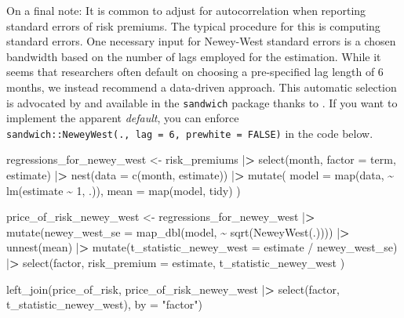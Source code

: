 \documentclass[
]{book}
\newenvironment{Shaded}{\begin{snugshade}}{\end{snugshade}}
\newcommand{\AttributeTok}[1]{\textcolor[rgb]{0.61,0.61,0.61}{#1}}
\newcommand{\DecValTok}[1]{\textcolor[rgb]{0.06,0.06,0.06}{#1}}
\newcommand{\ErrorTok}[1]{\textcolor[rgb]{0.14,0.14,0.14}{\textbf{#1}}}
\newcommand{\FunctionTok}[1]{\textcolor[rgb]{0,0,0}{#1}}
\newcommand{\NormalTok}[1]{#1}
\newcommand{\OtherTok}[1]{\textcolor[rgb]{0.37,0.37,0.37}{#1}}
\newcommand{\SpecialCharTok}[1]{\textcolor[rgb]{0,0,0}{#1}}
\newcommand{\StringTok}[1]{\textcolor[rgb]{0.5,0.5,0.5}{#1}}
\begin{document}
On a final note: It is common to adjust for autocorrelation when reporting standard errors of risk premiums. The typical procedure for this is computing \citet{Newey1987} standard errors. One necessary input for Newey-West standard errors is a chosen bandwidth based on the number of lags employed for the estimation. While it seems that researchers often default on choosing a pre-specified lag length of 6 months, we instead recommend a data-driven approach. This automatic selection is advocated by \citet{Newey1994} and available in the \texttt{sandwich} package thanks to \citet{Zeileis2004}. If you want to implement the apparent \emph{default}, you can enforce \texttt{sandwich::NeweyWest(.,\ lag\ =\ 6,\ prewhite\ =\ FALSE)} in the code below.

\begin{Shaded}
\begin{Highlighting}[]
\NormalTok{regressions\_for\_newey\_west }\OtherTok{\textless{}{-}}\NormalTok{ risk\_premiums }\SpecialCharTok{|}\ErrorTok{\textgreater{}}
  \FunctionTok{select}\NormalTok{(month, }\AttributeTok{factor =}\NormalTok{ term, estimate) }\SpecialCharTok{|}\ErrorTok{\textgreater{}}
  \FunctionTok{nest}\NormalTok{(}\AttributeTok{data =} \FunctionTok{c}\NormalTok{(month, estimate)) }\SpecialCharTok{|}\ErrorTok{\textgreater{}}
  \FunctionTok{mutate}\NormalTok{(}
    \AttributeTok{model =} \FunctionTok{map}\NormalTok{(data, }\SpecialCharTok{\textasciitilde{}} \FunctionTok{lm}\NormalTok{(estimate }\SpecialCharTok{\textasciitilde{}} \DecValTok{1}\NormalTok{, .)),}
    \AttributeTok{mean =} \FunctionTok{map}\NormalTok{(model, tidy)}
\NormalTok{  )}

\NormalTok{price\_of\_risk\_newey\_west }\OtherTok{\textless{}{-}}\NormalTok{ regressions\_for\_newey\_west }\SpecialCharTok{|}\ErrorTok{\textgreater{}}
  \FunctionTok{mutate}\NormalTok{(}\AttributeTok{newey\_west\_se =} \FunctionTok{map\_dbl}\NormalTok{(model, }\SpecialCharTok{\textasciitilde{}} \FunctionTok{sqrt}\NormalTok{(}\FunctionTok{NeweyWest}\NormalTok{(.)))) }\SpecialCharTok{|}\ErrorTok{\textgreater{}}
  \FunctionTok{unnest}\NormalTok{(mean) }\SpecialCharTok{|}\ErrorTok{\textgreater{}}
  \FunctionTok{mutate}\NormalTok{(}\AttributeTok{t\_statistic\_newey\_west =}\NormalTok{ estimate }\SpecialCharTok{/}\NormalTok{ newey\_west\_se) }\SpecialCharTok{|}\ErrorTok{\textgreater{}}
  \FunctionTok{select}\NormalTok{(factor,}
    \AttributeTok{risk\_premium =}\NormalTok{ estimate,}
\NormalTok{    t\_statistic\_newey\_west}
\NormalTok{  )}

\FunctionTok{left\_join}\NormalTok{(price\_of\_risk,}
\NormalTok{          price\_of\_risk\_newey\_west }\SpecialCharTok{|}\ErrorTok{\textgreater{}} \FunctionTok{select}\NormalTok{(factor, t\_statistic\_newey\_west),}
          \AttributeTok{by =} \StringTok{"factor"}\NormalTok{)}
\end{Highlighting}
\end{Shaded}
\end{document}
